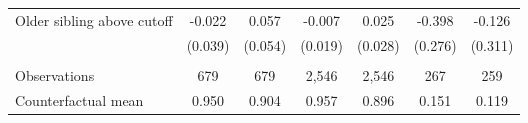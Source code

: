 {{\begin{tabular}{lcccccc}
Older sibling above cutoff&      -0.022   &       0.057   &      -0.007   &       0.025   &      -0.398   &      -0.126   \\
                    &     (0.039)   &     (0.054)   &     (0.019)   &     (0.028)   &     (0.276)   &     (0.311)   \\
                    &               &               &               &               &               &               \\
Observations        &         679   &         679   &       2,546   &       2,546   &         267   &         259   \\
Counterfactual mean &       0.950   &       0.904   &       0.957   &       0.896   &       0.151   &       0.119   \\
 

\bottomrule
\end{tabular}
}
}
